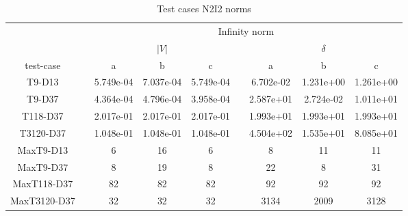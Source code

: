 \begin{table}
\renewcommand{\arraystretch}{1.3}
\centering
\label{}\hspace{2cm}\caption{Test cases N2I2 norms}
\begin{adjustbox}{width=1\textwidth} %
\small
\begin{tabular}{ccccccccc}
\toprule
{} && \multicolumn{7}{c}{Infinity norm}   \\
\cmidrule{3-9}
{} && \multicolumn{3}{c}{$|V|$} && \multicolumn{3}{c}{$\delta$}  \\
\cmidrule{3-5}\cmidrule{7-9}
 test-case &&        a &        b &       c &&        a &       b &        c \\
\midrule
T9-D13       &&  5.749e-04 &  7.037e-04 &  5.749e-04 &&  6.702e-02 &  1.231e+00 &  1.261e+00 \\
T9-D37       &&  4.364e-04 &  4.796e-04 &  3.958e-04 &&  2.587e+01 &  2.724e-02 &  1.011e+01 \\
T118-D37     &&  2.017e-01 &  2.017e-01 &  2.017e-01 &&  1.993e+01 &  1.993e+01 &  1.993e+01 \\
T3120-D37    &&  1.048e-01 &  1.048e-01 &  1.048e-01 &&  4.504e+02 &  1.535e+01 &  8.085e+01 \\
MaxT9-D13    &&          6 &         16 &          6 &&          8 &         11 &         11 \\
MaxT9-D37    &&          8 &         19 &          8 &&         22 &          8 &         31 \\
MaxT118-D37  &&         82 &         82 &         82 &&         92 &         92 &         92 \\
MaxT3120-D37 &&         32 &         32 &         32 &&       3134 &       2009 &       3128 \\
\bottomrule
\end{tabular}
\end{adjustbox}
\end{table}
